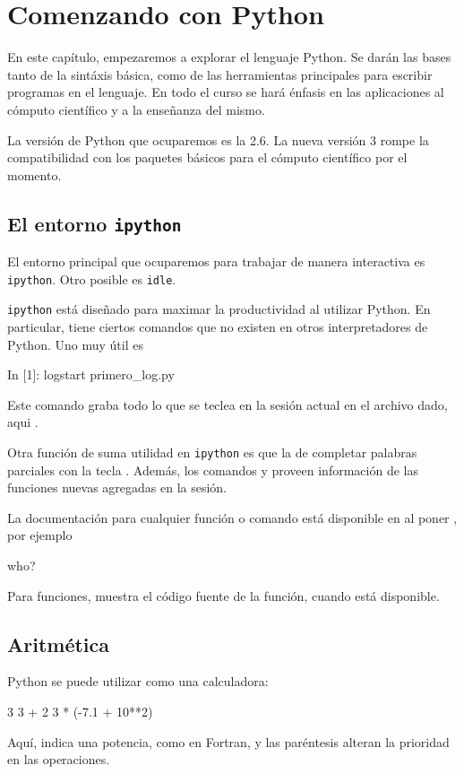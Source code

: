 \chapter{Comenzando con Python}

En este capítulo, empezaremos a explorar el lenguaje Python. Se darán las bases tanto de la sintáxis básica, como de las herramientas principales para escribir programas en el lenguaje. En todo el curso se hará énfasis en las aplicaciones al cómputo científico y a la enseñanza del mismo.

La versión de Python que ocuparemos es la 2.6. La nueva versión 3 rompe la compatibilidad con los paquetes básicos para el cómputo científico por el momento.


\section{El entorno \texttt{ipython}}

El entorno principal que ocuparemos para trabajar de manera interactiva es \texttt{ipython}. Otro posible es \texttt{idle}.

\texttt{ipython} está diseñado para maximar la productividad al utilizar Python.
En particular, tiene ciertos comandos que no existen en otros interpretadores de Python.
Uno muy útil es
\begin{python}
In [1]: logstart primero_log.py
\end{python}
Este comando graba todo lo que se teclea en la sesión actual en el archivo dado, aqui .

Otra función de suma utilidad en \texttt{ipython} es que la de completar palabras parciales con la tecla .
Además, los comandos  y  proveen información de las funciones nuevas agregadas en la sesión.

La documentación para cualquier función o comando está disponible en  al poner , por ejemplo
\begin{python}
who?
\end{python}
Para funciones,  muestra el código fuente de la función, cuando está disponible.


\section{Aritmética}
Python se puede utilizar como una calculadora:
\begin{python}
3
3 + 2
3 * (-7.1 + 10**2)
\end{python}
Aquí, \inl{**} indica una potencia, como en Fortran, y las paréntesis alteran la prioridad en las operaciones.


